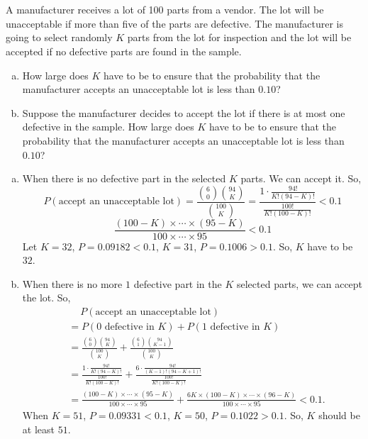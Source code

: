 \documentclass[14pt]{elegantbook}
\begin{document}

\setcounter{chapter}{4}
\chapter{}
    \setcounter{chapter}{3}
    \setcounter{exer}{1}
    \begin{exercise}
        A manufacturer receives a lot of 100 parts from a vendor. The lot will be unacceptable if more than five of the parts are defective. The manufacturer is going to select randomly $K$ parts from the lot for inspection and the lot will be accepted if no defective parts are found in the sample. 
        \begin{enumerate}[(a)]
            \item How large does $K$ have to be to ensure that the probability that the manufacturer accepts an unacceptable lot is less than $0.10$? 
            \item Suppose the manufacturer decides to accept the lot if there is at most one defective in the sample. How large does $K$ have to be to ensure that the probability that the manufacturer accepts an unacceptable lot is less than $0.10$? 
        \end{enumerate}
    \end{exercise}

    \begin{solution}
        \begin{enumerate}[(a)]
            \item When there is no defective part in the selected $K$ parts. We can accept it. So, 
            \[P(\text{accept an unacceptable lot})=\frac{\binom{6}{0}\binom{94}{K}}{\binom{100}{K}}=\frac{1\cdot\frac{94!}{K!(94-K)!}}{\frac{100!}{K!(100-K)!}}<0.1\]
            \[\frac{(100-K)\times\cdots\times(95-K)}{100\times\cdots\times 95}<0.1\]
            Let $K=32$, $P=0.09182<0.1$, $K=31$, $P=0.1006>0.1$. So, $K$ have to be $32$. 
            \item When there is no more $1$ defective part in the $K$ selected parts, we can accept the lot. So,
            \begin{align*}
                &\quad\ P(\text{accept an unacceptable lot})\\&=P(\text{$0$ defective in $K$})+P(\text{$1$ defective in $K$})\\
                &=\frac{\binom{6}{0}\binom{94}{K}}{\binom{100}{K}}+\frac{\binom{6}{1}\binom{94}{K-1}}{\binom{100}{K}}\\
                &=\frac{1\cdot\frac{94!}{K!(94-K)!}}{\frac{100!}{K!(100-K)!}}+\frac{6\cdot\frac{94!}{(K-1)!(94-K+1)!}}{\frac{100!}{K!(100-K)!}}\\
                &=\frac{(100-K)\times\cdots\times(95-K)}{100\times\cdots\times 95}+\frac{6K\times(100-K)\times\cdots\times(96-K)}{100\times\cdots\times 95}<0.1. 
            \end{align*}
            When $K=51$, $P=0.09331<0.1$, $K=50$, $P=0.1022>0.1$. So, $K$ should be at least $51$. 
        \end{enumerate}
    \end{solution}
\end{document}
